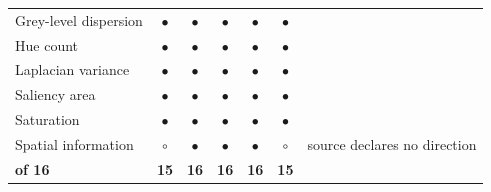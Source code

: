 \begin{table}[!ht]
\begin{tabular}{@{}l ccccc >{\raggedright\arraybackslash}p{3.2cm}@{}}
Grey-level dispersion & \textcolor{accentgreen!70!black}{\textbf{$\bullet$}} & \textcolor{accentgreen!70!black}{\textbf{$\bullet$}} & \textcolor{accentgreen!70!black}{\textbf{$\bullet$}} & \textcolor{accentgreen!70!black}{\textbf{$\bullet$}} & \textcolor{accentgreen!70!black}{\textbf{$\bullet$}} & \textcolor{black!55}{\scriptsize } \\
\rowcolor{rowlight}Hue count & \textcolor{accentgreen!70!black}{\textbf{$\bullet$}} & \textcolor{accentgreen!70!black}{\textbf{$\bullet$}} & \textcolor{accentgreen!70!black}{\textbf{$\bullet$}} & \textcolor{accentgreen!70!black}{\textbf{$\bullet$}} & \textcolor{accentgreen!70!black}{\textbf{$\bullet$}} & \textcolor{black!55}{\scriptsize } \\
Laplacian variance & \textcolor{accentgreen!70!black}{\textbf{$\bullet$}} & \textcolor{accentgreen!70!black}{\textbf{$\bullet$}} & \textcolor{accentgreen!70!black}{\textbf{$\bullet$}} & \textcolor{accentgreen!70!black}{\textbf{$\bullet$}} & \textcolor{accentgreen!70!black}{\textbf{$\bullet$}} & \textcolor{black!55}{\scriptsize } \\
\rowcolor{rowlight}Saliency area & \textcolor{accentgreen!70!black}{\textbf{$\bullet$}} & \textcolor{accentgreen!70!black}{\textbf{$\bullet$}} & \textcolor{accentgreen!70!black}{\textbf{$\bullet$}} & \textcolor{accentgreen!70!black}{\textbf{$\bullet$}} & \textcolor{accentgreen!70!black}{\textbf{$\bullet$}} & \textcolor{black!55}{\scriptsize } \\
Saturation & \textcolor{accentgreen!70!black}{\textbf{$\bullet$}} & \textcolor{accentgreen!70!black}{\textbf{$\bullet$}} & \textcolor{accentgreen!70!black}{\textbf{$\bullet$}} & \textcolor{accentgreen!70!black}{\textbf{$\bullet$}} & \textcolor{accentgreen!70!black}{\textbf{$\bullet$}} & \textcolor{black!55}{\scriptsize } \\
\rowcolor{rowlight}Spatial information & \textcolor{black!28}{$\circ$} & \textcolor{accentgreen!70!black}{\textbf{$\bullet$}} & \textcolor{accentgreen!70!black}{\textbf{$\bullet$}} & \textcolor{accentgreen!70!black}{\textbf{$\bullet$}} & \textcolor{black!28}{$\circ$} & \textcolor{black!55}{\scriptsize source declares no direction} \\
\midrule
\textbf{of 16} & \textbf{15} & \textbf{16} & \textbf{16} & \textbf{16} & \textbf{15} & \\
\bottomrule
\end{tabular}
\end{table}
